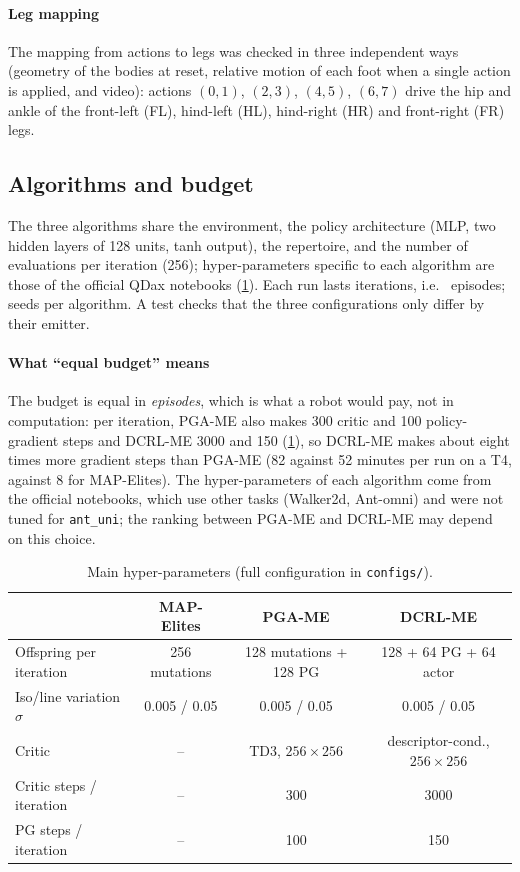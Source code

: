 \documentclass[11pt,a4paper]{article}
\newcommand{\ME}{MAP-Elites}
\newcommand{\PGA}{PGA-ME}
\newcommand{\DCRL}{DCRL-ME}
\begin{document}
\paragraph{Leg mapping} The mapping from actions to legs was checked in three independent ways (geometry of the
bodies at reset, relative motion of each foot when a single action is applied, and video): actions $(0,1)$,
$(2,3)$, $(4,5)$, $(6,7)$ drive the hip and ankle of the front-left (FL), hind-left (HL), hind-right (HR) and
front-right (FR) legs.

\subsection{Algorithms and budget}
The three algorithms share the environment, the policy architecture (MLP, two hidden layers of 128 units, tanh
output), the repertoire, and the number of evaluations per iteration (256); hyper-parameters specific to each
algorithm are those of the official QDax notebooks (\cref{tab:hparams}). Each run lasts \NIterations{}
iterations, i.e.\ \NEvaluations{} episodes; \NSeeds{} seeds per algorithm. A test checks that the three
configurations only differ by their emitter.

\paragraph{What ``equal budget'' means} The budget is equal in \emph{episodes}, which is what a robot would pay, not in
computation: per iteration, \PGA{} also makes 300 critic and 100 policy-gradient steps and \DCRL{} 3000 and 150
(\cref{tab:hparams}), so \DCRL{} makes about eight times more gradient steps than \PGA{} (82 against 52 minutes per run on
a T4, against 8 for \ME). The hyper-parameters of each algorithm come from the official notebooks, which use other
tasks (Walker2d, Ant-omni) and were not tuned for \texttt{ant\_uni}; the ranking between \PGA{} and \DCRL{} may
depend on this choice.

\begin{table}[htbp]
\centering\small
\caption{Main hyper-parameters (full configuration in \texttt{configs/}).}
\label{tab:hparams}
\begin{tabular}{lccc}
\toprule
 & \ME & \PGA & \DCRL \\
\midrule
Offspring per iteration & 256 mutations & 128 mutations + 128 PG & 128 + 64 PG + 64 actor \\
Iso/line variation $\sigma$ & 0.005 / 0.05 & 0.005 / 0.05 & 0.005 / 0.05 \\
Critic & -- & TD3, $256\times256$ & descriptor-cond., $256\times256$ \\
Critic steps / iteration & -- & 300 & 3000 \\
PG steps / iteration & -- & 100 & 150 \\
\bottomrule
\end{tabular}
\end{table}
\end{document}
